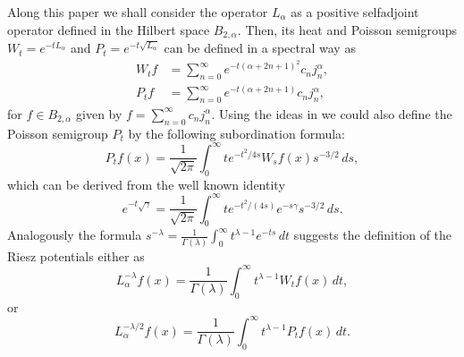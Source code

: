 \documentclass[11pt,a4paper]{amsart}
\newcommand{\jna}{j_n^{\alpha}}
\theoremstyle{plain}
\theoremstyle{remark}
\begin{document}
Along this paper we shall consider the operator $L_\alpha$ as a positive selfadjoint operator defined in the Hilbert space $B_{2,\alpha}$. Then, its heat and Poisson semigroups $W_t = e^{-tL_\alpha}$ and $P_t = e^{-t\sqrt{L_\alpha}}$ can be defined in a spectral way as
\begin{align*}
   W_t f &= \sum_{n=0}^\infty e^{-t(\alpha+2n+1)^2} c_n \jna,
   \\
   P_t f &= \sum_{n=0}^\infty e^{-t(\alpha+2n+1)} c_n \jna,
\end{align*}
for $f \in B_{2,\alpha}$ given by $f=\sum_{n=0}^\infty c_n \jna$.
Using the ideas in \cite{Stein} we could also define the Poisson semigroup $P_t$ by the following subordination formula:
\[
  P_tf(x)
  = \frac{1}{\sqrt{2\pi}} \int_0^\infty t e^{-t^2/4s}W_sf(x) s^{-3/2}\,ds,
\]
which can be derived from the well known identity
\[
   e^{-t\sqrt{\gamma}} =
   \frac{1}{\sqrt{2\pi}} \int_0^\infty t e^{-t^2/(4s)}e^{-s\gamma} s^{-3/2}\,ds.
\]
Analogously the formula
$s^{-\lambda} = \frac{1}{\Gamma(\lambda)}\int_0^\infty t^{\lambda-1} e^{-ts}\,dt$
suggests the definition of the Riesz potentials either  as
\begin{equation}
\label{eq:frac}
  L_\alpha^{-\lambda}f(x) =
  \frac{1}{\Gamma(\lambda)}\int_0^\infty t^{\lambda-1} W_tf(x)\,dt,
\end{equation}
or
\begin{equation}
\label{eq:Poisson}
   L_\alpha^{-\lambda/2}f(x)
   = \frac{1}{\Gamma(\lambda)} \int_0^\infty t^{\lambda-1} P_tf(x) \,dt.
\end{equation}
\end{document}
